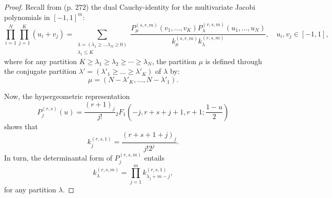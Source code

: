 \documentclass[12pt,reqno]{amsart}
\begin{document}
\begin{proof}
    Recall from \cite{MR3075094} (p. 272) the dual Cauchy-identity for the multivariate Jacobi polynomials in $[-1,1]^m$:
	\begin{equation*}
		\prod_{i=1}^N\prod_{j=1}^K (u_i + v_j) = \sum_{\substack{\lambda = (\lambda_1 \geq \dots \lambda_N \geq 0) \\ \lambda_1 \leq K}} \frac{P_{\mu}^{(s,r,m)}(v_1,\dots, v_K) P_{\lambda}^{(r,s,m)}(u_1, \dots, u_N)}{k_{\mu}^{(s,r,m)}k_{\lambda}^{(r,s,m)}},
		\quad u_i, v_j \in [-1,1],
	\end{equation*}
	where for any partition $K \geq \lambda_1 \geq \lambda_2 \geq \cdots \geq \lambda_N$, the partition $\mu$ is defined through the conjugate partition
    $\lambda' = (\lambda'_1 \geq \dots \geq \lambda'_K)$ of $\lambda$ by:
	\begin{equation*}
		\mu = (N - \lambda'_K, \dots, N - \lambda'_1).
	\end{equation*}
 
 Now, the hypergeometric representation 
    \begin{equation*}
        P_j^{(r,s)}(u) = \frac{(r+1)_j}{j!}{}_2F_1\left(-j, r+s+j+1, r+1; \frac{1-u}{2}\right)
    \end{equation*}
shows that 
\begin{equation*}
  k_{j}^{(r,s,1)} = \frac{(r+s+1+j)_j}{j!2^j}.  
\end{equation*}
In turn, the determinantal form of $P_j^{(r,s,m)}$ entails 
\begin{equation*}
  k_{\lambda}^{(r,s,m)} = \prod_{j=1}^m k_{\lambda_j+m-j}^{(r,s,1)},  
\end{equation*}
for any partition $\lambda$. 


\end{proof}
\end{document}
